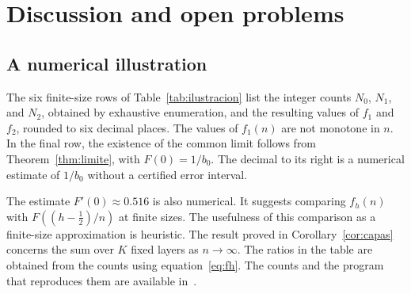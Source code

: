 \section{Discussion and open problems}\label{sec:discusion}

\subsection{A numerical illustration}

The six finite-size rows of Table~\ref{tab:ilustracion} list the integer counts $N_0$, $N_1$, and $N_2$,
obtained by exhaustive
enumeration, and the resulting values of $f_1$ and $f_2$, rounded to six decimal places. The values of
$f_1(n)$ are not monotone in
$n$. In the final row, the existence of the common limit follows from
Theorem~\ref{thm:limite}, with $F(0)=1/b_0$. The decimal to its right is a numerical estimate of $1/b_0$
without a certified error
interval.

The estimate $F'(0)\approx0.516$ is also numerical. It suggests comparing $f_h(n)$ with $F((h-\tfrac12)/n)$
at finite sizes. The usefulness of
this comparison as a finite-size approximation is heuristic. The result proved in Corollary~\ref{cor:capas}
concerns the sum over $K$
fixed layers as $n\to\infty$. The ratios in the table are obtained from the counts using
equation~\eqref{eq:fh}.
The counts and the program that reproduces them are available in~\cite{Codigo}.

